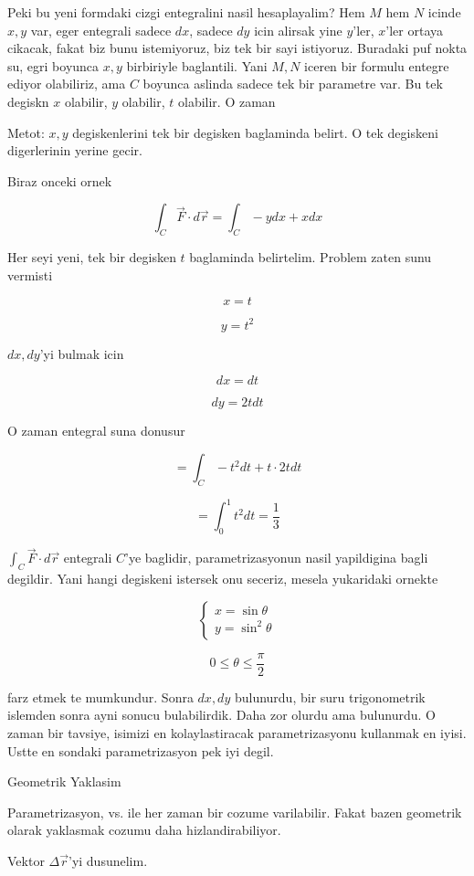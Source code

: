 \documentclass[12pt,fleqn]{article}\usepackage{../common}
\begin{document}
Peki bu yeni formdaki cizgi entegralini nasil hesaplayalim? Hem $M$ hem $N$
icinde $x,y$ var, eger entegrali sadece $dx$, sadece $dy$ icin alirsak yine
$y$'ler, $x$'ler ortaya cikacak, fakat biz bunu istemiyoruz, biz tek bir
sayi istiyoruz. Buradaki puf nokta su, egri boyunca $x,y$ birbiriyle
baglantili. Yani $M,N$ iceren bir formulu entegre ediyor olabiliriz, ama
$C$ boyunca aslinda sadece tek bir parametre var. Bu tek degiskn $x$
olabilir, $y$ olabilir, $t$ olabilir. O zaman 

Metot: $x,y$ degiskenlerini tek bir degisken baglaminda belirt. O tek degiskeni
digerlerinin yerine gecir. 

Biraz onceki ornek

\[ \int_C \vec{F} \cdot d\vec{r} 
= \int_C -y dx + x dx
\]

Her seyi yeni, tek bir degisken $t$ baglaminda belirtelim. Problem zaten
sunu vermisti

\[ x = t  \]

\[ y = t^2 \]

$dx,dy$'yi bulmak icin

\[ dx = dt \]

\[ dy = 2tdt \]

O zaman entegral suna donusur

\[ = \int_C -t^2 dt + t \cdot 2t dt\]

\[ = \int_0^1 t^2 dt = \frac{1}{3}\]


$\int_C \vec{F} \cdot d\vec{r}$ entegrali $C$'ye baglidir, parametrizasyonun nasil 
yapildigina bagli degildir. Yani hangi degiskeni istersek onu seceriz,
mesela yukaridaki ornekte 

\[ 
\left\{ \begin{array}{l}
x  = \sin\theta \\
y  = \sin^2\theta 
\end{array} \right.
 \]

\[ 0 \le \theta \le \frac{\pi}{2} \]

farz etmek te mumkundur. Sonra $dx,dy$ bulunurdu, bir suru trigonometrik
islemden sonra ayni sonucu bulabilirdik. Daha zor olurdu ama bulunurdu. O
zaman bir tavsiye, isimizi en kolaylastiracak parametrizasyonu kullanmak en
iyisi. Ustte en sondaki parametrizasyon pek iyi degil. 

Geometrik Yaklasim

Parametrizasyon, vs. ile her zaman bir cozume varilabilir. Fakat bazen
geometrik olarak yaklasmak cozumu daha hizlandirabiliyor. 

Vektor $\Delta \vec{r}$'yi dusunelim. 
\end{document}
